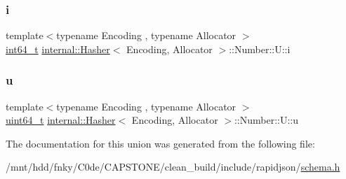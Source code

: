 \subsubsection{\texorpdfstring{i}{i}}
{\footnotesize\ttfamily template$<$typename Encoding , typename Allocator $>$ \\
\hyperlink{stdint_8h_a414156feea104f8f75b4ed9e3121b2f6}{int64\+\_\+t} \hyperlink{classinternal_1_1Hasher}{internal\+::\+Hasher}$<$ Encoding, Allocator $>$\+::Number\+::\+U\+::i}

\mbox{\label{unioninternal_1_1Hasher_1_1Number_1_1U_a6380a48b72a4bb5dd7291d47814e6421}} 
\subsubsection{\texorpdfstring{u}{u}}
{\footnotesize\ttfamily template$<$typename Encoding , typename Allocator $>$ \\
\hyperlink{stdint_8h_aec6fcb673ff035718c238c8c9d544c47}{uint64\+\_\+t} \hyperlink{classinternal_1_1Hasher}{internal\+::\+Hasher}$<$ Encoding, Allocator $>$\+::Number\+::\+U\+::u}



The documentation for this union was generated from the following file\+:\begin{DoxyCompactItemize}
\item 
/mnt/hdd/fnky/\+C0de/\+C\+A\+P\+S\+T\+O\+N\+E/clean\+\_\+build/include/rapidjson/\hyperlink{schema_8h}{schema.\+h}\end{DoxyCompactItemize}
